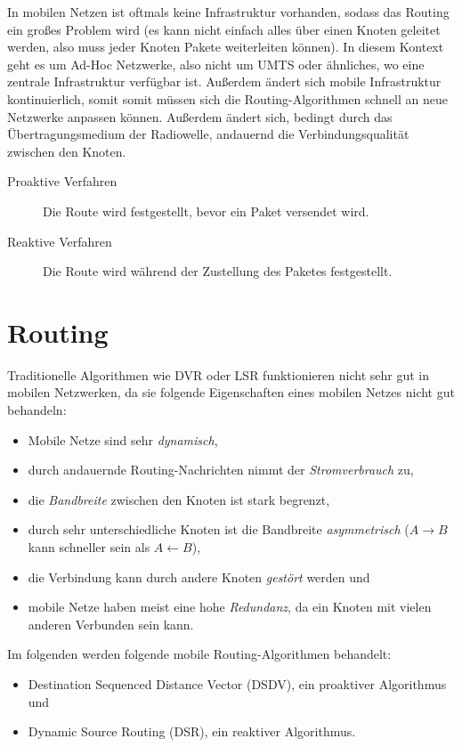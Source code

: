 \documentclass[a4paper, 11pt, accentcolor = tud3b]{tudreport}
\begin{document}
	    In mobilen Netzen ist oftmals keine Infrastruktur vorhanden, sodass das Routing ein großes Problem wird (es kann nicht einfach alles über einen Knoten geleitet werden, also muss jeder Knoten Pakete weiterleiten können). In diesem Kontext geht es um Ad-Hoc Netzwerke, also nicht um UMTS oder ähnliches, wo eine zentrale Infrastruktur verfügbar ist. Außerdem ändert sich mobile Infrastruktur kontinuierlich, somit somit müssen sich die Routing-Algorithmen schnell an neue Netzwerke anpassen können. Außerdem ändert sich, bedingt durch das Übertragungsmedium der Radiowelle, andauernd die Verbindungsqualität zwischen den Knoten.
	    
	    \begin{description}
	    	\item[Proaktive Verfahren] Die Route wird festgestellt, bevor ein Paket versendet wird.
	    	\item[Reaktive Verfahren] Die Route wird während der Zustellung des Paketes festgestellt.
	    \end{description}
	    
	    \section{Routing}
		    Traditionelle Algorithmen wie DVR oder LSR funktionieren nicht sehr gut in mobilen Netzwerken, da sie folgende Eigenschaften eines mobilen Netzes nicht gut behandeln:
		    \begin{itemize}
             	\item Mobile Netze sind sehr \textit{dynamisch},
             	\item durch andauernde Routing-Nachrichten nimmt der \textit{Stromverbrauch} zu,
             	\item die \textit{Bandbreite} zwischen den Knoten ist stark begrenzt,
             	\item durch sehr unterschiedliche Knoten ist die Bandbreite \textit{asymmetrisch} ($ A \rightarrow B $ kann schneller sein als $ A \leftarrow B $),
             	\item die Verbindung kann durch andere Knoten \textit{gestört} werden und
             	\item mobile Netze haben meist eine hohe \textit{Redundanz}, da ein Knoten mit vielen anderen Verbunden sein kann.
		    \end{itemize}
		    
		    Im folgenden werden folgende mobile Routing-Algorithmen behandelt:
		    \begin{itemize}
             	\item Destination Sequenced Distance Vector (DSDV), ein proaktiver Algorithmus und
             	\item Dynamic Source Routing (DSR), ein reaktiver Algorithmus.
		    \end{itemize}
		    
\end{document}
